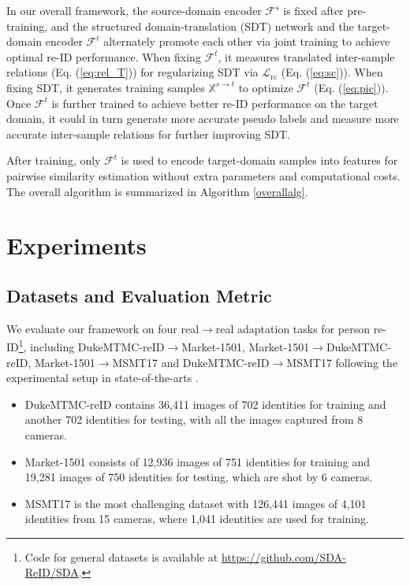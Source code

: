 \documentclass[journal]{IEEEtran}
\def\sX{{\mathbb{X}}}
\begin{document}
In our overall framework, the source-domain encoder $\mathcal{F}^s$ is fixed after pre-training, and the structured domain-translation (SDT) network and the target-domain encoder $\mathcal{F}^t$ alternately promote each other via joint training to achieve optimal re-ID performance.
When fixing $\mathcal{F}^t$,
it measures translated inter-sample relations (Eq. (\ref{eq:rel_T})) for regularizing SDT via
$\mathcal{L}_\text{rc}$ (Eq. (\ref{eq:sc})).
When fixing SDT, it generates training samples $\sX^{s\to t}$ to optimize $\mathcal{F}^t$ (Eq. (\ref{eq:pic})).
Once $\mathcal{F}^t$ is further trained to achieve better re-ID performance on the target domain, it could in turn generate more accurate pseudo labels and measure more accurate inter-sample relations for further improving SDT.

After training, only $\mathcal{F}^t$ is used to encode target-domain samples into features for pairwise similarity estimation without extra parameters and computational costs.
The overall algorithm is summarized in Algorithm \ref{overallalg}.



\section{Experiments}

\subsection{Datasets and Evaluation Metric}

We evaluate our framework on four real$\to$real adaptation tasks for person re-ID\footnote{Code for general datasets is available at \url{https://github.com/SDA-ReID/SDA}.}, including DukeMTMC-reID$\to$Market-1501, Market-1501$\to$DukeMTMC-reID, Market-1501$\to$MSMT17 and DukeMTMC-reID$\to$MSMT17 following the experimental setup in state-of-the-arts \cite{ge2020mutual,yang2019selfsimilarity,zhang2019self}.
\begin{itemize}
\item DukeMTMC-reID \cite{dukemtmc}
contains 36,411 images of 702 identities for training and another 702 identities for testing, with all the images captured from 8 cameras.
\item Market-1501 \cite{market} consists of 12,936 images of 751 identities for training and
19,281 images of 750 identities for testing, which are shot by 6 cameras.
\item MSMT17 \cite{wei2018person} is the most challenging dataset with 126,441 images of 4,101 identities from 15 cameras, where 1,041 identities are used for training.
\end{itemize}
\end{document}
